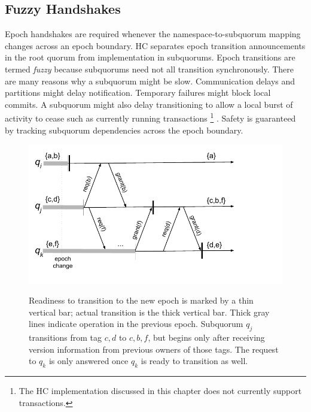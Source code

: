 \subsection{Fuzzy Handshakes}

Epoch handshakes are required whenever the namespace-to-subquorum mapping changes across an epoch boundary.
HC separates epoch transition announcements in the root quorum from implementation in subquorums.
Epoch transitions are termed \emph{fuzzy} because subquorums need not all transition synchronously.
There are many reasons why a subquorum might be slow.
Communication delays and partitions might delay notification.
Temporary failures might block local commits.
A subquorum might also delay transitioning to allow a local burst of activity to cease such as currently running transactions\renewcommand{\baselinestretch}{1} \small\footnotesize\footnote{The HC implementation discussed in this chapter does not currently support transactions.}\renewcommand{\baselinestretch}{2} \small\normalsize.
Safety is guaranteed by tracking subquorum dependencies across the epoch boundary.

\begin{figure}
    \begin{center}
        \includegraphics[width=5in]{figures/ch03_namespace_handoff.pdf}
    \end{center}
    \renewcommand{\baselinestretch}{1}
    \small\normalsize

    \begin{quote}
        \caption[Epoch Transition: Fuzzy Handshakes]{Readiness to transition to the new epoch is marked by a thin vertical bar; actual transition is the thick vertical bar.  Thick gray lines indicate operation in the previous epoch.  Subquorum $q_j$ transitions from tag ${c,d}$ to ${c,b,f}$, but begins only after receiving version information from previous owners of those tags.  The request to $q_k$ is only answered once $q_k$ is ready to transition as well.}
        \label{fig:ch03_namespace_handoff}
    \end{quote}
\end{figure}
\renewcommand{\baselinestretch}{2}
\small\normalsize

